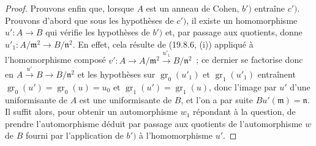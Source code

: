 \begin{proof}
Prouvons enfin que, lorsque $A$ est un anneau de Cohen, $b')$ entraîne $c')$.
Prouvons d'abord que sous les hypothèses de $c')$, il existe un homomorphisme
$u':A\to B$ qui vérifie les hypothèses de $b')$ et, par passage aux quotients,
donne $u'_1:A/\mathfrak m^2\to B/\mathfrak n^2$. En effet, cela résulte de
(19.8.6, (i)) appliqué à l'homomorphisme composé
$v':A\to A/\mathfrak m^2\xrightarrow{u'_1}B/\mathfrak n^2$~;
ce dernier se factorise donc en $A\xrightarrow{u'}B\to B/\mathfrak n^2$ et
les hypothèses sur $\operatorname{gr}_0(u'_1)$ et
$\operatorname{gr}_1(u'_1)$ entraînent
$\operatorname{gr}_0(u')=\operatorname{gr}_0(u)=u_0$ et
$\operatorname{gr}_1(u')=\operatorname{gr}_1(u)$, donc l'image par $u'$ d'une
uniformisante de $A$ est une uniformisante de $B$, et l'on a par suite
$Bu'(\mathfrak m)=\mathfrak n$. Il suffit alors, pour obtenir un automorphisme
$w_1$ répondant à la question, de prendre l'automorphisme déduit par passage
aux quotients de l'automorphisme $w$ de $B$ fourni par l'application de $b')$
à l'homomorphisme $u'$.
\end{proof}
